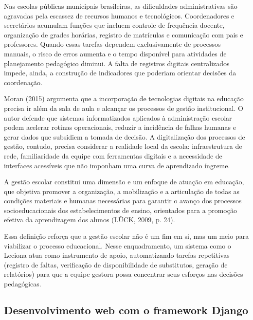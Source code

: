 Nas escolas públicas municipais brasileiras, as dificuldades administrativas são agravadas pela escassez de recursos humanos e tecnológicos. Coordenadores e secretários acumulam funções que incluem controle de frequência docente, organização de grades horárias, registro de matrículas e comunicação com pais e professores. Quando essas tarefas dependem exclusivamente de processos manuais, o risco de erros aumenta e o tempo disponível para atividades de planejamento pedagógico diminui. A falta de registros digitais centralizados impede, ainda, a construção de indicadores que poderiam orientar decisões da coordenação.

Moran (2015) argumenta que a incorporação de tecnologias digitais na educação precisa ir além da sala de aula e alcançar os processos de gestão institucional. O autor defende que sistemas informatizados aplicados à administração escolar podem acelerar rotinas operacionais, reduzir a incidência de falhas humanas e gerar dados que subsidiem a tomada de decisão. A digitalização dos processos de gestão, contudo, precisa considerar a realidade local da escola: infraestrutura de rede, familiaridade da equipe com ferramentas digitais e a necessidade de interfaces acessíveis que não imponham uma curva de aprendizado íngreme.

\begin{citacao}
A gestão escolar constitui uma dimensão e um enfoque de atuação em educação, que objetiva promover a organização, a mobilização e a articulação de todas as condições materiais e humanas necessárias para garantir o avanço dos processos socioeducacionais dos estabelecimentos de ensino, orientados para a promoção efetiva da aprendizagem dos alunos (LÜCK, 2009, p. 24).
\end{citacao}

Essa definição reforça que a gestão escolar não é um fim em si, mas um meio para viabilizar o processo educacional. Nesse enquadramento, um sistema como o Leciona atua como instrumento de apoio, automatizando tarefas repetitivas (registro de faltas, verificação de disponibilidade de substitutos, geração de relatórios) para que a equipe gestora possa concentrar seus esforços nas decisões pedagógicas.

\subsection{Desenvolvimento web com o framework Django}

